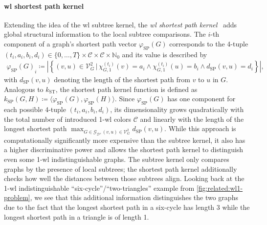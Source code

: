 \paragraph{\ac{wl} shortest path kernel}
Extending the idea of the \ac{wl} subtree kernel, the \textit{\ac{wl} shortest path kernel}~\cite{Shervashidze2011}\cite{Borgwardt2005} adds global structural information to the local subtree comparisons.
The $i$-th component of a graph's shortest path vector $\varphi_{\text{SP}}(G)$ corresponds to the 4-tuple $(t_i, a_i, b_i, d_i) \in {\{ 0, \dots, T \}} \times \mathcal{C} \times \mathcal{C} \times \mathbb{N}_0$ and its value is described by
\begin{align}
	{\varphi_{\text{SP}}(G)}_i \coloneqq \left| \left\{ (v, u) \in \mathcal{V}_G^2 \,|\, {\chi_{G,1}^{(t_i)}(v) = a_i} \land {\chi_{G,1}^{(t_i)}(u) = b_i} \land {d_{\text{SP}}(v, u) = d_i} \right\} \right| \text{,} %
\end{align}
with $d_{\text{SP}}(v, u)$ denoting the length of the shortest path from $v$ to $u$ in $G$.
Analogous to $k_{\text{ST}}$, the shortest path kernel function is defined as $k_{\text{SP}}(G, H) \coloneqq \langle \varphi_{\text{SP}}(G), \varphi_{\text{SP}}(H) \rangle$.
Since $\varphi_{\text{SP}}(G)$ has one component for each possible 4-tuple $(t_i, a_i, b_i, d_i)$, its dimensionality grows quadratically with the total number of introduced 1-\acs{wl} colors $\mathcal{C}$ and linearly with the length of the longest shortest path $\max_{G \in \mathcal{G}_{\mathcal{D}}, (v, u) \in \mathcal{V}_G^2} d_{\text{SP}}(v, u)$.
While this approach is computationally significantly more expensive than the subtree kernel, it also has a higher discriminative power and allows the shortest path kernel to distinguish even some 1-\acs{wl} indistinguishable graphs.
The subtree kernel only compares graphs by the presence of local subtrees;
the shortest path kernel additionally checks how well the distances between those subtrees align.
Looking back at the 1-\acs{wl} indistinguishable ``six-cycle''/``two-triangles'' example from \cref{fig:related:wl1-problem}, we see that this additional information distinguishes the two graphs due to the fact that the longest shortest path in a six-cycle has length 3 while the longest shortest path in a triangle is of length 1.

